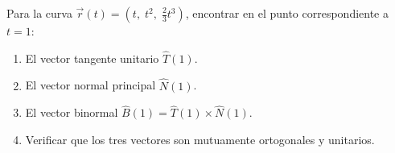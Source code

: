 Para la curva $\vec{r}(t) = (t,\; t^2,\; \frac{2}{3}t^3)$, encontrar en el punto correspondiente a $t = 1$:
\begin{enumerate}
    \item El vector tangente unitario $\hat{T}(1)$.
    \item El vector normal principal $\hat{N}(1)$.
    \item El vector binormal $\hat{B}(1) = \hat{T}(1) \times \hat{N}(1)$.
    \item Verificar que los tres vectores son mutuamente ortogonales y unitarios.
\end{enumerate}